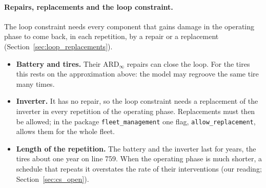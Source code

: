 \documentclass[11pt,a4paper]{article}
\theoremstyle{plain}
\theoremstyle{definition}
\theoremstyle{remark}
\begin{document}
\paragraph{Repairs, replacements and the loop constraint.}
The loop constraint needs every component that gains damage in the operating phase to come back, in each repetition, by a repair or a replacement (Section~\ref{sec:loop_replacements}).
\begin{itemize}
  \item \textbf{Battery and tires.}
    Their $\text{ARD}_\infty$ repairs can close the loop.
    For the tires this rests on the approximation above: the model may regroove the same tire many times.
  \item \textbf{Inverter.}
    It has no repair, so the loop constraint needs a replacement of the inverter in every repetition of the operating phase.
    Replacements must then be allowed; in the package \texttt{fleet\_management} one flag, \texttt{allow\_replacement}, allows them for the whole fleet.
  \item \textbf{Length of the repetition.}
    The battery and the inverter last for years, the tires about one year on line 759.
    When the operating phase is much shorter, a schedule that repeats it overstates the rate of their interventions (our reading; Section~\ref{sec:cs_open}).
\end{itemize}
\end{document}
